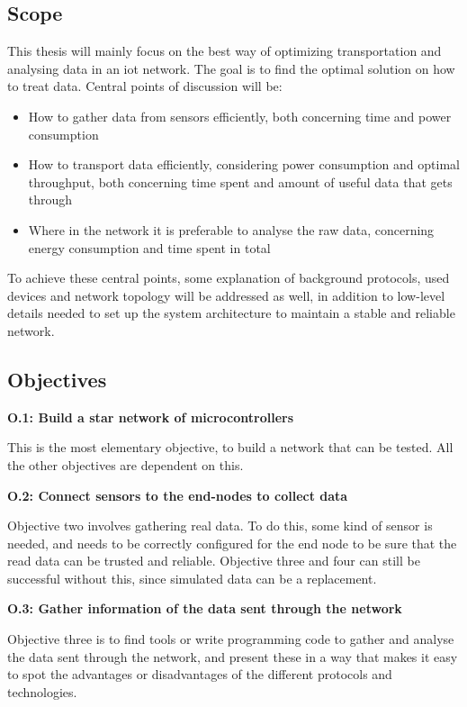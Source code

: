 \subsection{Scope}

\noindent This thesis will mainly focus on the best way of optimizing transportation and analysing data in an \gls{iot} network. The goal is to find the optimal solution on how to treat data. Central points of discussion will be:

\begin{itemize}
	\item How to gather data from sensors efficiently, both concerning time and power consumption
	\item How to transport data efficiently, considering power consumption and optimal throughput, both concerning time spent and amount of useful data that gets through
	\item Where in the network it is preferable to analyse the raw data, concerning energy consumption and time spent in total
\end{itemize}

\noindent To achieve these central points, some explanation of background protocols, used devices and network topology will be addressed as well, in addition to low-level details needed to set up the system architecture to maintain a stable and reliable network. 


\subsection{Objectives}

\noindent \textbf{O.1: Build a star network of \glspl{microcontroller}}

\noindent This is the most elementary objective, to build a network that can be tested. All the other objectives are dependent on this.  

\noindent\textbf{O.2: Connect sensors to the end-nodes to collect data}

\noindent Objective two involves gathering real data. To do this, some kind of sensor is needed, and needs to be correctly configured for the end node to be sure that the read data can be trusted and reliable. Objective three and four can still be successful without this, since simulated data can be a replacement.  

\noindent\textbf{O.3: Gather information of the data sent through the network}

\noindent Objective three is to find tools or write programming code to gather and analyse the data sent through the network, and present these in a way that makes it easy to spot the advantages or disadvantages of the different protocols and technologies. 

